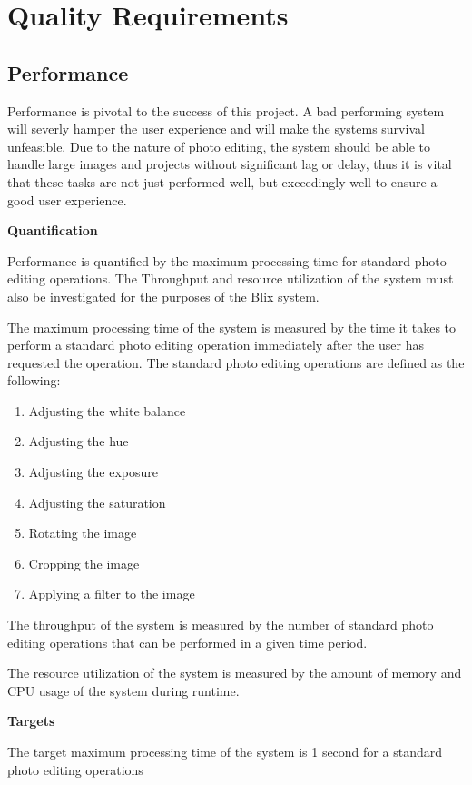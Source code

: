\documentclass[11pt,a4paper]{article}
\begin{document}
\section{Quality Requirements}
\subsection*{Performance}

Performance is pivotal to the success of this project. A bad performing system
will severly hamper the user experience and will make the systems survival unfeasible.
Due to the nature of photo editing, the system should be able to handle large
images and projects without significant lag or delay, thus it is vital that these tasks are 
not just performed well, but exceedingly well to ensure a good user experience.

{\bf Quantification}

Performance is quantified by the maximum processing time for standard photo editing operations.
The Throughput and resource utilization of the system must also be investigated for the purposes
of the Blix system.

The maximum processing time of the system is measured by the time it takes to perform a standard photo editing operation
immediately after the user has requested the operation. The standard photo editing operations are defined as the following:
\begin{enumerate}
    \item Adjusting the white balance
    \item Adjusting the hue
    \item Adjusting the exposure
    \item Adjusting the saturation
    \item Rotating the image
    \item Cropping the image
    \item Applying a filter to the image
\end{enumerate}

The throughput of the system is measured by the number of standard photo editing operations that can be performed in a given time period.

The resource utilization of the system is measured by the amount of memory and CPU usage of the system during runtime.


{\bf Targets}

The target maximum processing time of the system is 1 second for a standard photo editing operations
\end{document}
